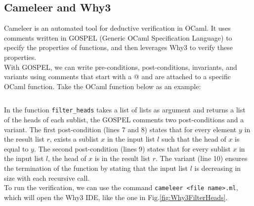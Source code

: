 \documentclass[runningheads]{llncs}
\begin{document}
\subsection{Cameleer and Why3}
Cameleer\autocite{pereiraCameleerDeductiveVerification2021} is an automated tool for deductive verification in OCaml. It uses comments written in GOSPEL\autocite{chargueraudGOSPELProvidingOCaml2019} (Generic OCaml Specification Language) to specify the properties of functions, and then leverages Why3\autocite{filliatreWhy3WherePrograms2013a} to verify these properties.\\
With GOSPEL, we can write pre-conditions, post-conditions, invariants, and variants using comments that start with a @ and are attached to a specific OCaml function. Take the OCaml function below as an example:
\inputminted[fontsize=\small,linenos,xleftmargin=20pt]{ocaml}{../filter_heads/filter_heads.ml}
In the function \texttt{filter\_heads} takes a list of lists as argument and returns a list of the heads of each sublist, the GOSPEL comments two post-conditions and a variant.
The first post-condition (lines 7 and 8) states that for every element \( y \) in the result list \( r \), exists a sublist \( x \) in the input list \( l \) such that the head of \( x \) is equal to \( y \).
The second post-condition (lines 9) states that for every sublist \( x \) in the input list \( l \), the head of \( x \) is in the result list \( r \).
The variant (line 10) ensures the termination of the function by stating that the input list \( l \) is decreasing in size with each recursive call.\\
To run the verification, we can use the command \texttt{cameleer <file name>.ml}, which will open the Why3 IDE, like the one in Fig.\ref{fig:Why3FilterHeads}.
\end{document}
